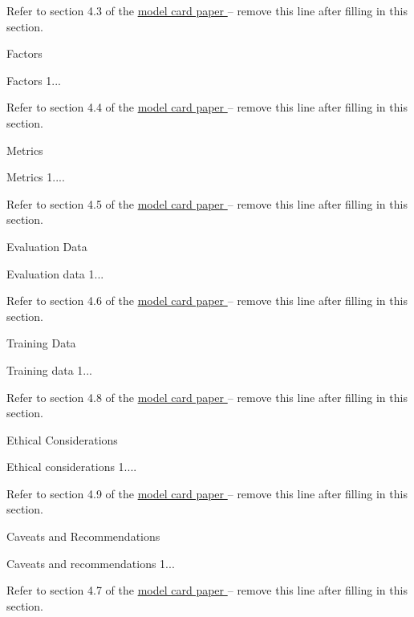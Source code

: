 \documentclass{article}
\begin{document}
\begin{adjustwidth}{-60pt}{-30pt}
\begin{singlespace}
\begin{tcolorbox}[title=\textbf{Model Card - CheXNet},
    breakable, sharp corners, boxrule=0.7pt]
{Refer to section 4.3 of the \href{https://arxiv.org/abs/1810.03993}{model card paper } -- remove this line after filling in this section.

\begin{mcsection}{Factors}
    \item Factors 1...
\end{mcsection}

Refer to section 4.4 of the \href{https://arxiv.org/abs/1810.03993}{model card paper } -- remove this line after filling in this section.

\begin{mcsection}{Metrics}
    \item Metrics 1....
\end{mcsection}

Refer to section 4.5 of the \href{https://arxiv.org/abs/1810.03993}{model card paper } -- remove this line after filling in this section.

\begin{mcsection}{Evaluation Data}
    \item Evaluation data 1...
\end{mcsection}

Refer to section 4.6 of the \href{https://arxiv.org/abs/1810.03993}{model card paper } -- remove this line after filling in this section.

\begin{mcsection}{Training Data}
    \item Training data 1...
\end{mcsection}

\pagebreak

Refer to section 4.8 of the \href{https://arxiv.org/abs/1810.03993}{model card paper } -- remove this line after filling in this section.

\begin{mcsection}{Ethical Considerations}
    \item Ethical considerations 1....
\end{mcsection}

Refer to section 4.9 of the \href{https://arxiv.org/abs/1810.03993}{model card paper } -- remove this line after filling in this section.

\begin{mcsection}{Caveats and Recommendations}
    \item Caveats and recommendations 1...
\end{mcsection}

Refer to section 4.7 of the \href{https://arxiv.org/abs/1810.03993}{model card paper } -- remove this line after filling in this section.

}
\end{tcolorbox}
\end{singlespace}
\end{adjustwidth}
\end{document}
